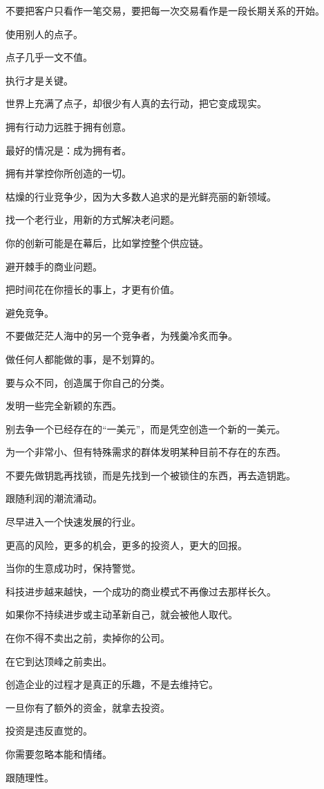 \documentclass[
]{article}
\begin{document}
不要把客户只看作一笔交易，要把每一次交易看作是一段长期关系的开始。

使用别人的点子。

点子几乎一文不值。

执行才是关键。

世界上充满了点子，却很少有人真的去行动，把它变成现实。

拥有行动力远胜于拥有创意。

最好的情况是：成为拥有者。

拥有并掌控你所创造的一切。

枯燥的行业竞争少，因为大多数人追求的是光鲜亮丽的新领域。

找一个老行业，用新的方式解决老问题。

你的创新可能是在幕后，比如掌控整个供应链。

避开棘手的商业问题。

把时间花在你擅长的事上，才更有价值。

避免竞争。

不要做茫茫人海中的另一个竞争者，为残羹冷炙而争。

做任何人都能做的事，是不划算的。

要与众不同，创造属于你自己的分类。

发明一些完全新颖的东西。

别去争一个已经存在的``一美元''，而是凭空创造一个新的一美元。

为一个非常小、但有特殊需求的群体发明某种目前不存在的东西。

不要先做钥匙再找锁，而是先找到一个被锁住的东西，再去造钥匙。

跟随利润的潮流涌动。

尽早进入一个快速发展的行业。

更高的风险，更多的机会，更多的投资人，更大的回报。

当你的生意成功时，保持警觉。

科技进步越来越快，一个成功的商业模式不再像过去那样长久。

如果你不持续进步或主动革新自己，就会被他人取代。

在你不得不卖出之前，卖掉你的公司。

在它到达顶峰之前卖出。

创造企业的过程才是真正的乐趣，不是去维持它。

一旦你有了额外的资金，就拿去投资。

投资是违反直觉的。

你需要忽略本能和情绪。

跟随理性。
\end{document}
